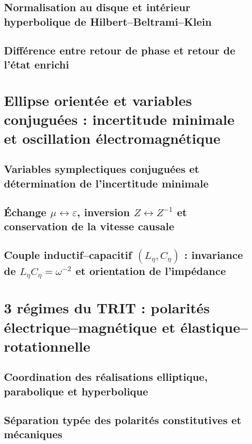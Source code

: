 \subsection{Normalisation au disque et intérieur hyperbolique de Hilbert--Beltrami--Klein}

\subsection{Différence entre retour de phase et retour de l'état enrichi}


\section{Ellipse orientée et variables conjuguées : incertitude minimale et oscillation électromagnétique}
\subsection{Variables symplectiques conjuguées et détermination de l'incertitude minimale}

\subsection{Échange \(\mu\leftrightarrow\varepsilon\), inversion \(Z\leftrightarrow Z^{-1}\) et conservation de la vitesse causale}

\subsection{Couple inductif--capacitif \((L_\eta,C_\eta)\) : invariance de \(L_\eta C_\eta=\omega^{-2}\) et orientation de l'impédance}


\section{3 régimes du TRIT : polarités électrique--magnétique et élastique--rotationnelle}
\subsection{Coordination des réalisations elliptique, parabolique et hyperbolique}

\subsection{Séparation typée des polarités constitutives et mécaniques}


